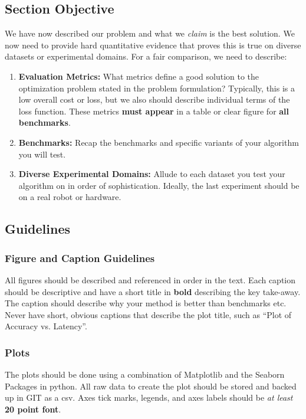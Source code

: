 \subsection{Section Objective}
We have now described our problem and what we \textit{claim} is the best solution.
We now need to provide hard quantitative evidence that proves this is true on diverse datasets or experimental domains. For a fair comparison, we need to describe: 

\begin{enumerate}
    \item \textbf{Evaluation Metrics: } What metrics define a good solution to the optimization problem stated in the problem formulation? Typically, this is a low overall cost or loss, but we also should describe individual terms of the loss function. These metrics \textbf{must appear} in a table or clear figure for \textbf{all benchmarks}. 
    \item \textbf{Benchmarks: } Recap the benchmarks and specific variants of your algorithm you will test. 
    \item \textbf{Diverse Experimental Domains: } Allude to each dataset you test your algorithm on in order of sophistication. Ideally, the last experiment should be on a real robot or hardware.
\end{enumerate}

\subsection{Guidelines}

\subsubsection{Figure and Caption Guidelines}

All figures should be described and referenced in order in the text. 
Each caption should be descriptive and have a short title in \textbf{bold} describing the key take-away. The caption should describe why your method is better than benchmarks etc. Never have short, obvious captions that describe the plot title, such as ``Plot of Accuracy vs. Latency''.

\subsubsection{Plots}

The plots should be done using a combination of Matplotlib and the Seaborn Packages in python. All raw data to create the plot should be stored and backed up in GIT as a csv. Axes tick marks, legends, and axes labels should be \textit{at least} \textbf{20 point font}.

